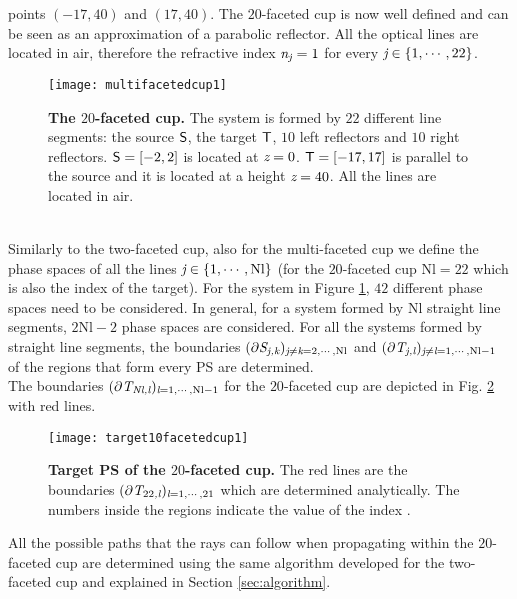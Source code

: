 points $(-17,40)$ and $(17,40)$. The $20$-faceted cup is now well defined and can be seen as an approximation of a parabolic reflector.
All the optical lines are located in air, therefore the refractive index $\textit{n}_{\textit{j}}=1$ for every $\textit{j} \in \{1, \cdots, 22\}$.
\begin{figure}[h]
\centering
\label{fig:multifacetedcup}
\texttt{[image: multifacetedcup1]}
\caption{\textbf{The $20$-faceted cup.} The system is formed by $22$ different line segments: the source $\textsf{S}$, the target
$\textsf{T}$, $10$ left reflectors and $10$ right reflectors.
 $\textsf{S}=[-2,2]$ is located at $\textit{z}=0$. $\textsf{T} = [-17,17]$ is parallel to the source and it is located at a height $\textit{z}=40$.
 All the lines are located in air.}
\label{fig:multifacetedcup}
\end{figure}
\\ \indent
Similarly to the two-faceted cup, also for the multi-faceted cup we define the phase spaces of all the lines $\textit{j}\in\{1, \cdots, \textrm{Nl}\}$ (for the $20$-faceted cup $\textrm{Nl}=22$ which is also the index of the target). 
For the system in Figure \ref{fig:multifacetedcup}, $42$ different phase spaces need to be considered.
In general, for a system formed by $\textrm{Nl}$ straight line segments, $2\textrm{Nl}-2$ phase spaces are considered.
For all the systems formed by straight line segments, the boundaries $(\partial\mbox{$\emph{S}_{\textit{\textit{j},\textit{k}}}$})_{\textit{j}\neq\textit{k}=2, \cdots, \textrm{Nl}}$ and $(\partial\mbox{$\emph{T}_{\textit{\textit{j},\textit{l}}}$})_{\textit{j}\neq\textit{l}=1, \cdots, \textrm{Nl}-1}$ of the regions that form every PS are determined. \\
\indent The boundaries $(\partial\mbox{$\emph{T}_{\textit{\textrm{Nl},\textit{l}}}$})_{\textit{l}=1, \cdots, \textrm{Nl}-1}$ for the $20$-faceted cup are depicted in Fig. \ref{fig:T20} with red lines.
\begin{figure}[h]
\centering
\label{fig:T20}
\texttt{[image: target10facetedcup1]}
\caption{\textbf{Target PS of the $20$-faceted cup.}
The red lines are the boundaries $(\partial\mbox{$\emph{T}_{\textit{$22$,\textit{l}}}$})_{\textit{l}=1, \cdots, 21}$ which are determined analytically. The numbers inside the regions  indicate the value of the index \lineak.}
\label{fig:T20}
\end{figure}
All the possible paths that the rays can follow when propagating within the $20$-faceted cup are determined using the same algorithm developed for the two-faceted cup and explained in Section \ref{sec:algorithm}.
